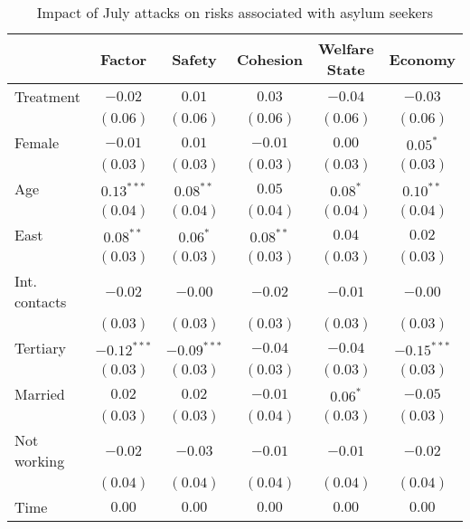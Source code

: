 
\begin{table}
\caption{Impact of July attacks on risks associated with asylum seekers}
\begin{center}
\begin{tabular}{l c c c c c}
\toprule
 & Factor & Safety & Cohesion & Welfare State & Economy \\
\midrule
Treatment     & $-0.02$       & $0.01$        & $0.03$      & $-0.04$    & $-0.03$       \\
              & $(0.06)$      & $(0.06)$      & $(0.06)$    & $(0.06)$   & $(0.06)$      \\
Female        & $-0.01$       & $0.01$        & $-0.01$     & $0.00$     & $0.05^{*}$    \\
              & $(0.03)$      & $(0.03)$      & $(0.03)$    & $(0.03)$   & $(0.03)$      \\
Age           & $0.13^{***}$  & $0.08^{**}$   & $0.05$      & $0.08^{*}$ & $0.10^{**}$   \\
              & $(0.04)$      & $(0.04)$      & $(0.04)$    & $(0.04)$   & $(0.04)$      \\
East          & $0.08^{**}$   & $0.06^{*}$    & $0.08^{**}$ & $0.04$     & $0.02$        \\
              & $(0.03)$      & $(0.03)$      & $(0.03)$    & $(0.03)$   & $(0.03)$      \\
Int. contacts & $-0.02$       & $-0.00$       & $-0.02$     & $-0.01$    & $-0.00$       \\
              & $(0.03)$      & $(0.03)$      & $(0.03)$    & $(0.03)$   & $(0.03)$      \\
Tertiary      & $-0.12^{***}$ & $-0.09^{***}$ & $-0.04$     & $-0.04$    & $-0.15^{***}$ \\
              & $(0.03)$      & $(0.03)$      & $(0.03)$    & $(0.03)$   & $(0.03)$      \\
Married       & $0.02$        & $0.02$        & $-0.01$     & $0.06^{*}$ & $-0.05$       \\
              & $(0.03)$      & $(0.03)$      & $(0.04)$    & $(0.03)$   & $(0.03)$      \\
Not working   & $-0.02$       & $-0.03$       & $-0.01$     & $-0.01$    & $-0.02$       \\
              & $(0.04)$      & $(0.04)$      & $(0.04)$    & $(0.04)$   & $(0.04)$      \\
Time          & $0.00$        & $0.00$        & $0.00$      & $0.00$     & $0.00$        \\

\end{tabular}
\end{center}
\end{table}

